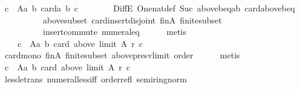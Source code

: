 \begin{isabellebody}
\ {\isachardoublequoteopen}{\isasymforall}c\ {\isasymin}\ A{\isacharminus}{\kern0pt}{\isacharbraceleft}{\kern0pt}a{\isacharcomma}{\kern0pt}\ b{\isacharbraceright}{\kern0pt}{\isachardot}{\kern0pt}\ card{\isacharbraceleft}{\kern0pt}a{\isacharcomma}{\kern0pt}\ b{\isacharcomma}{\kern0pt}\ c{\isacharbraceright}{\kern0pt}\ {\isacharequal}{\kern0pt}\ {}{\isachardoublequoteclose}\isanewline
\ \ \ \ \isamarkupfalse%
\ DiffE\ One{\isacharunderscore}{\kern0pt}nat{\isacharunderscore}{\kern0pt}def\ Suc{\isacharunderscore}{\kern0pt}{}\ above{\isacharunderscore}{\kern0pt}b{\isacharunderscore}{\kern0pt}eq{\isacharunderscore}{\kern0pt}ab\ card{\isacharunderscore}{\kern0pt}above{\isacharunderscore}{\kern0pt}b{\isacharunderscore}{\kern0pt}eq{\isacharunderscore}{\kern0pt}{}\isanewline
\ \ \ \ \ \ \ \ \ \ above{\isacharunderscore}{\kern0pt}subset\ card{\isacharunderscore}{\kern0pt}insert{\isacharunderscore}{\kern0pt}disjoint\ finA\ finite{\isacharunderscore}{\kern0pt}subset\isanewline
\ \ \ \ \ \ \ \ \ \ insert{\isacharunderscore}{\kern0pt}commute\ numeral{\isacharunderscore}{\kern0pt}{}{\isacharunderscore}{\kern0pt}eq{\isacharunderscore}{\kern0pt}{}\isanewline
\ \ \ \ \isamarkupfalse%
\ metis\isanewline
\ \ \isamarkupfalse%
\ \isamarkupfalse%
\isanewline
\ \ \ \ {\isachardoublequoteopen}{\isasymforall}c\ {\isasymin}\ A{\isacharminus}{\kern0pt}{\isacharbraceleft}{\kern0pt}a{\isacharcomma}{\kern0pt}\ b{\isacharbraceright}{\kern0pt}{\isachardot}{\kern0pt}\ card\ {\isacharparenleft}{\kern0pt}above\ {\isacharparenleft}{\kern0pt}limit\ A\ r{\isacharparenright}{\kern0pt}\ c{\isacharparenright}{\kern0pt}\ {\isasymge}\ {}{\isachardoublequoteclose}\isanewline
\ \ \ \ \isamarkupfalse%
\ card{\isacharunderscore}{\kern0pt}mono\ finA\ finite{\isacharunderscore}{\kern0pt}subset\ above{\isacharunderscore}{\kern0pt}presv{\isacharunderscore}{\kern0pt}limit\ order\isanewline
\ \ \ \ \isamarkupfalse%
\ metis\isanewline
\ \ \isamarkupfalse%
\ {\isachardoublequoteopen}{\isasymforall}c\ {\isasymin}\ A{\isacharminus}{\kern0pt}{\isacharbraceleft}{\kern0pt}a{\isacharcomma}{\kern0pt}\ b{\isacharbraceright}{\kern0pt}{\isachardot}{\kern0pt}\ card\ {\isacharparenleft}{\kern0pt}above\ {\isacharparenleft}{\kern0pt}limit\ A\ r{\isacharparenright}{\kern0pt}\ c{\isacharparenright}{\kern0pt}\ {\isachargreater}{\kern0pt}\ {}{\isachardoublequoteclose}\isanewline
\ \ \ \ \isamarkupfalse%
\ less{\isacharunderscore}{\kern0pt}le{\isacharunderscore}{\kern0pt}trans\ numeral{\isacharunderscore}{\kern0pt}less{\isacharunderscore}{\kern0pt}iff\ order{\isacharunderscore}{\kern0pt}refl\ semiring{\isacharunderscore}{\kern0pt}norm{\isacharparenleft}{\kern0pt}{}{}{\isacharparenright}{\kern0pt}\isanewline

\end{isabellebody}
